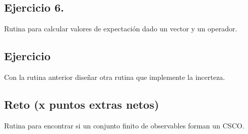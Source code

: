 \documentclass[11pt,letterpaper]{article}
\begin{document}
\subsection*{Ejercicio 6.}
Rutina para calcular valores de expectación dado un vector y un operador.

\subsection*{Ejercicio }
Con la rutina anterior diseñar otra rutina que implemente la incerteza.

\subsection*{Reto (x puntos extras netos)}
Rutina para encontrar si un conjunto finito de observables forman un CSCO.

\end{document}
